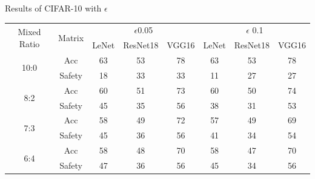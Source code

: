 \documentclass[journal,article,submit,moreauthors,pdftex]{Definitions/mdpi}
\begin{document}
\begin{specialtable}[H]
    \centering
    \caption{Results of CIFAR-10 with \begin{math}\epsilon\end{math}}
    \label{cifar10-result}
    {\small
    \begin{tabular}{|c|c|c|c|c|c|c|c|}
    \hline
    \multirow{2}{*}{Mixed Ratio} & \multirow{2}{*}{Matrix} & \multicolumn{3}{c|}{\begin{math}\epsilon\end{math}0.05}            & \multicolumn{3}{c|}{\begin{math}\epsilon\end{math} 0.1}         \\ \cline{3-8} 
                                 &                           & LeNet               & ResNet18              & VGG16              & LeNet              & ResNet18              & VGG16              \\ \hline
    \multirow{2}{*}{10:0}        & Acc                       & 63                  & 53                    & 78                 & 63                 & 53                    & 78                 \\ \cline{2-8} 
                                 & Safety                    & 18                  & 33                    & 33                 & 11                 & 27                    & 27                 \\ \hline
    \multirow{2}{*}{8:2}         & Acc                       & 60                  & 51                    & 73                 & 60                 & 50                    & 74                 \\ \cline{2-8} 
                                 & Safety                    & 45                  & 35                    & 56                 & 38                 & 31                    & 53                 \\ \hline
    \multirow{2}{*}{7:3}         & Acc                       & 58                  & 49                    & 72                 & 57                 & 49                    & 69                 \\ \cline{2-8} 
                                 & Safety                    & 45                  & 36                    & 56                 & 41                 & 34                    & 54                 \\ \hline
    \multirow{2}{*}{6:4}         & Acc                       & 58                  & 48                    & 70                 & 58                 & 47                    & 70                 \\ \cline{2-8} 
                                 & Safety                    & 47                  & 36                    & 56                 & 45                 & 34                    & 56                 \\ \hline
    \end{tabular}
    }
\end{specialtable}
\end{document}
